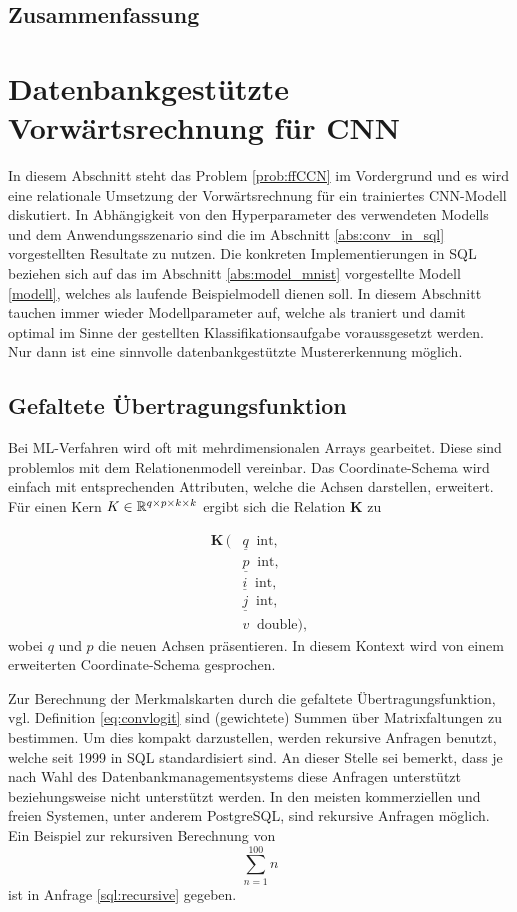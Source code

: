 \subsection{Zusammenfassung}
\label{abs:sum_conc_in_sql}


\section{Datenbankgestützte Vorwärtsrechnung für CNN}
\label{abs_CNN_in_SQL}
In diesem Abschnitt steht das Problem \ref{prob:ffCCN} im Vordergrund und es wird eine relationale Umsetzung der Vorwärtsrechnung für ein trainiertes CNN-Modell diskutiert. In Abhängigkeit von den Hyperparameter des verwendeten Modells und dem Anwendungsszenario sind die im Abschnitt \ref{abs:conv_in_sql} vorgestellten Resultate zu nutzen.    
Die konkreten Implementierungen in SQL beziehen sich auf das im Abschnitt \ref{abs:model_mnist} vorgestellte Modell \ref{modell}, welches als laufende Beispielmodell dienen soll. In diesem Abschnitt tauchen immer wieder Modellparameter auf, welche als traniert und damit optimal im Sinne der gestellten Klassifikationsaufgabe voraussgesetzt werden. Nur dann ist eine sinnvolle datenbankgestützte Mustererkennung möglich.  

\subsection*{Gefaltete Übertragungsfunktion}
Bei ML-Verfahren wird oft mit mehrdimensionalen Arrays gearbeitet. Diese sind problemlos mit dem Relationenmodell vereinbar. Das Coordinate-Schema wird einfach mit entsprechenden Attributen, welche die Achsen darstellen, erweitert. Für einen Kern $K \in \mathbb{R}^{q \times p \times k \times k}$ ergibt sich die Relation \textbf{K} zu

\begin{align*}
    \mathbf{K}\, ( 
    &\underline{q} \; \; \mathrm{int},\\
    &\underline{p} \; \; \mathrm{int},\\
    &\underline{i} \; \; \mathrm{int}, \\    
    &\underline{j} \; \; \mathrm{int}, \\
    &v \; \; \mathrm{double}),
\end{align*}
wobei $q$ und $p$ die neuen Achsen präsentieren. In diesem Kontext wird von einem erweiterten Coordinate-Schema gesprochen.

Zur Berechnung der Merkmalskarten durch die gefaltete Übertragungsfunktion, vgl. Definition \ref{eq:convlogit} sind (gewichtete) Summen über Matrixfaltungen zu bestimmen. Um dies kompakt darzustellen, werden rekursive Anfragen benutzt, welche seit 1999 in SQL standardisiert sind. An dieser Stelle sei bemerkt, dass je nach Wahl des Datenbankmanagementsystems diese Anfragen unterstützt beziehungsweise nicht unterstützt werden. In den meisten kommerziellen und freien Systemen, unter anderem PostgreSQL, sind rekursive Anfragen möglich. Ein Beispiel zur rekursiven Berechnung von
\begin{equation*}
   \label{eq:sum_n}
\sum_{n=1}^{100} n    
\end{equation*} 
ist in Anfrage \ref{sql:recursive} gegeben. 

